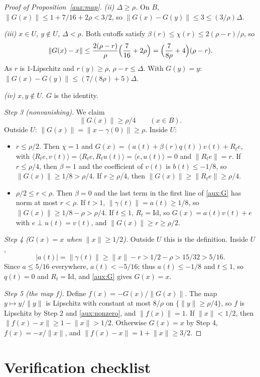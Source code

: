 \documentclass[11pt]{article}
\newcommand{\norm}[1]{\lVert #1\rVert}
\newcommand{\ip}[2]{\langle #1,#2\rangle}
\theoremstyle{definition}
\numberwithin{equation}{section}
\begin{document}
\begin{proof}[Proof of Proposition~\ref{aux:map}]
\emph{(ii) $\Delta\ge\rho$.} On $B$,
$\norm{G(x)}\le1+7/16+2\rho<3/2$, so
$\norm{G(x)-G(y)}\le3\le(3/\rho)\Delta$.

\emph{(iii) $x\in U$, $y\notin U$, $\Delta<\rho$.} Both cutoffs satisfy
$\beta(r)\le\chi(r)\le2(\rho-r)/\rho$, so
\[
 \norm{G(x)-x}\le\frac{2(\rho-r)}\rho\Bigl(\frac7{16}+2\rho\Bigr)
 =\Bigl(\frac{7}{8\rho}+4\Bigr)(\rho-r).
\]
As $r$ is $1$-Lipschitz and $r(y)\ge\rho$, $\rho-r\le\Delta$. With
$G(y)=y$: $\norm{G(x)-G(y)}\le(7/(8\rho)+5)\Delta$.

\emph{(iv) $x,y\notin U$.} $G$ is the identity.

\emph{Step 3 (nonvanishing).} We claim
\begin{equation}\label{aux:nonzero}
 \norm{G(x)}\ge\rho/4\qquad(x\in B).
\end{equation}
Outside $U$: $\norm{G(x)}=\norm{x-\gamma(0)}\ge\rho$. Inside $U$:
\begin{itemize}
\item $r\le\rho/2$. Then $\chi=1$ and
$G(x)=(a(t)+\beta(r)q(t))v(t)+R_te$, with
$\ip{R_te}{v(t)}=\ip{R_te}{R_tu(t)}=\ip e{u(t)}=0$ and
$\norm{R_te}=r$. If $r\le\rho/4$, then $\beta=1$ and the coefficient of
$v(t)$ is $b(t)\le-1/8$, so $\norm{G(x)}\ge1/8>\rho/4$. If
$r\ge\rho/4$, then $\norm{G(x)}\ge\norm{R_te}\ge\rho/4$.
\item $\rho/2\le r<\rho$. Then $\beta=0$ and the last term in the first
line of \eqref{aux:G} has norm at most $r<\rho$. If $t>1$,
$\norm{\gamma(t)}=a(t)\ge1/8$, so
$\norm{G(x)}\ge1/8-\rho>\rho/4$. If $t\le1$, $R_t=\mathrm{Id}$, so
$G(x)=a(t)v(t)+e$ with $e\perp u(t)=v(t)$, and
$\norm{G(x)}\ge r\ge\rho/2$.
\end{itemize}

\emph{Step 4 ($G(x)=x$ when $\norm x\ge1/2$).} Outside $U$ this is the
definition. Inside $U$,
\[
 |a(t)|=\norm{\gamma(t)}\ge\norm x-r>1/2-\rho>15/32>5/16 .
\]
Since $a\le5/16$ everywhere, $a(t)<-5/16$; thus $a(t)\le-1/8$ and
$t\le1$, so $q(t)=0$ and $R_t=\mathrm{Id}$, and \eqref{aux:G} gives
$G(x)=x$.

\emph{Step 5 (the map $f$).} Define $f(x)=-G(x)/\norm{G(x)}$. The map
$y\mapsto y/\norm y$ is Lipschitz with constant at most $8/\rho$ on
$\{\norm y\ge\rho/4\}$, so $f$ is Lipschitz by Step 2 and
\eqref{aux:nonzero}, and $\norm{f(x)}=1$. If $\norm x<1/2$, then
$\norm{f(x)-x}\ge1-\norm x>1/2$. Otherwise $G(x)=x$ by Step 4,
$f(x)=-x/\norm x$, and $\norm{f(x)-x}=1+\norm x\ge3/2$.
\end{proof}

\section*{Verification checklist}
\end{document}

